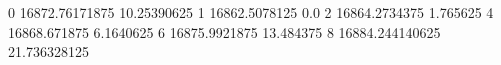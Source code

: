 0 16872.76171875 10.25390625
1 16862.5078125 0.0
2 16864.2734375 1.765625
4 16868.671875 6.1640625
6 16875.9921875 13.484375
8 16884.244140625 21.736328125
